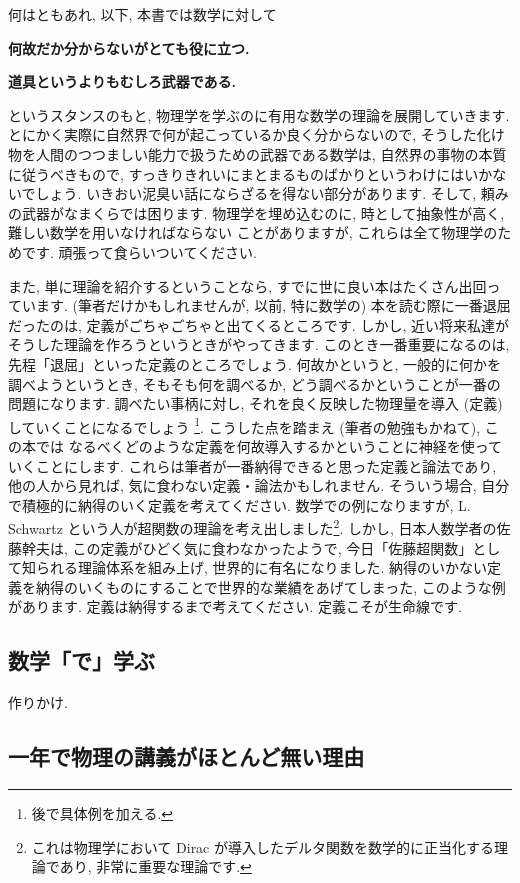\documentclass[openany, a4paper, oneside]{jsbook}
\begin{document}
何はともあれ, 以下, 本書では数学に対して
\begin{center}
\textbf{何故だか分からないがとても役に立つ.}

\textbf{道具というよりもむしろ武器である.}
\end{center}
というスタンスのもと, 物理学を学ぶのに有用な数学の理論を展開していきます.
とにかく実際に自然界で何が起こっているか良く分からないので,
そうした化け物を人間のつつましい能力で扱うための武器である数学は,
自然界の事物の本質に従うべきもので,
すっきりきれいにまとまるものばかりというわけにはいかないでしょう.
いきおい泥臭い話にならざるを得ない部分があります.
そして, 頼みの武器がなまくらでは困ります.
物理学を埋め込むのに, 時として抽象性が高く, 難しい数学を用いなければならない
ことがありますが, これらは全て物理学のためです.
頑張って食らいついてください.

また, 単に理論を紹介するということなら, すでに世に良い本はたくさん出回っています.
(筆者だけかもしれませんが, 以前, 特に数学の) 本を読む際に一番退屈だったのは,
定義がごちゃごちゃと出てくるところです.
しかし, 近い将来私達がそうした理論を作ろうというときがやってきます.
このとき一番重要になるのは, 先程「退屈」といった定義のところでしょう.
何故かというと, 一般的に何かを調べようというとき,
そもそも何を調べるか, どう調べるかということが一番の問題になります.
調べたい事柄に対し, それを良く反映した物理量を導入 (定義) していくことになるでしょう \footnote{後で具体例を加える.}.
こうした点を踏まえ (筆者の勉強もかねて), この本では
なるべくどのような定義を何故導入するかということに神経を使っていくことにします.
これらは筆者が一番納得できると思った定義と論法であり, 他の人から見れば,
気に食わない定義・論法かもしれません.
そういう場合, 自分で積極的に納得のいく定義を考えてください.
数学での例になりますが, L. Schwartz という人が超関数の理論を考え出しました\footnote{これは物理学において Dirac が導入したデルタ関数を数学的に正当化する理論であり,
非常に重要な理論です.}.
しかし, 日本人数学者の佐藤幹夫は, この定義がひどく気に食わなかったようで,
今日「佐藤超関数」として知られる理論体系を組み上げ, 世界的に有名になりました.
納得のいかない定義を納得のいくものにすることで世界的な業績をあげてしまった, このような例があります.
定義は納得するまで考えてください.
定義こそが生命線です.
\subsection{数学「で」学ぶ}

作りかけ.
\subsection{一年で物理の講義がほとんど無い理由}
\end{document}
